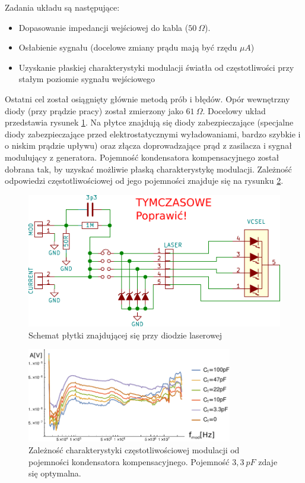 \documentclass[a4paper,10pt]{article}
\begin{document}
Zadania układu są następujące:
\begin{itemize}
 \item Dopasowanie impedancji wejściowej do kabla ($50~\Omega$).
 \item Osłabienie sygnału (docelowe zmiany prądu mają być rzędu $\mu A$)
 \item Uzyskanie płaskiej charakterystyki modulacji światła od częstotliwości przy stałym poziomie sygnału wejściowego
\end{itemize}

Ostatni cel został osiągnięty głównie metodą prób i błędów. Opór wewnętrzny diody (przy prądzie pracy) został zmierzony jako $61~ \Omega$.
Docelowy układ przedstawia rysunek \ref{sch-mod}. Na płytce znajdują się diody zabezpieczające (specjalne diody zabezpieczające przed elektrostatycznymi wyładowaniami, bardzo szybkie i o niskim prądzie upływu) oraz złącza doprowadzające prąd z zasilacza i sygnał modulujący z generatora. Pojemność kondensatora kompensacyjnego został dobrana tak, by uzyskać możliwie płaską charakterystykę modulacji. Zależność odpowiedzi częstotliwościowej od jego pojemności znajduje się na rysunku \ref{wyk-mod}.

\begin{figure}
\begin{center}
 \includegraphics{./obrazki/dings.pdf}
\end{center}
\caption{Schemat płytki znajdującej się przy diodzie laserowej}
\label{sch-mod}
\end{figure}

\begin{figure}
\begin{center}
 \includegraphics[width=0.8\textwidth]{./obrazki/bw.pdf}
\end{center}
\caption{Zależność charakterystyki częstotliwościowej modulacji od pojemności kondensatora kompensacyjnego. Pojemność $3{,}3~pF$ zdaje się optymalna.}
\label{wyk-mod}
\end{figure}
\end{document}
